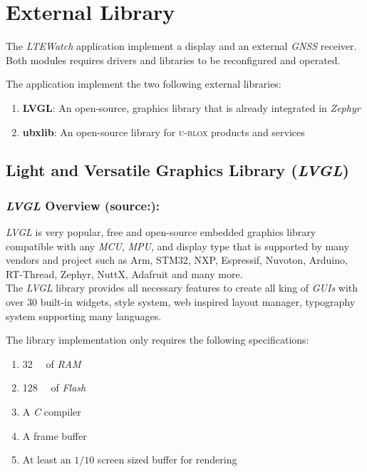 \documentclass[report.tex]{subfiles}
\begin{document}
\section{External Library}
The \textit{LTEWatch} application implement a display and an external \textit{GNSS} receiver. Both modules requires drivers and libraries to be reconfigured and operated.
\begin{flushleft}
The application implement the two following external libraries:
\end{flushleft}
\begin{enumerate}
\item \textbf{LVGL}: An open-source, graphics library that is already integrated in \textit{Zephyr}
\item \textbf{ubxlib}: An open-source library for \textsc{u-blox} products and services
\end{enumerate}

\subsection{Light and Versatile Graphics Library (\textit{LVGL})}
\subsubsection{\textit{LVGL} Overview (source:\cite{lvgl_lib}):}
\textit{LVGL} is very popular, free and open-source embedded graphics library compatible with any \textit{MCU}, \textit{MPU}, and display type that is supported by many vendors and project such as Arm, STM32, NXP, Espressif, Nuvoton, Arduino, RT-Thread, Zephyr, NuttX, Adafruit and many more.\\

The \textit{LVGL} library provides all necessary features to create all king of \textit{GUIs} with over 30 built-in widgets, style system, web inspired layout manager, typography system supporting many languages.
\begin{flushleft}
 The library implementation only requires the following specifications:
\end{flushleft}
\begin{enumerate}
\item \SI{32}{\kilo\byte} of \textit{RAM}
\item \SI{128}{\kilo\byte} of \textit{Flash}
\item A \textit{C} compiler
\item A frame buffer
\item At least an $1/10$ screen sized buffer for rendering
\end{enumerate}
\end{document}
